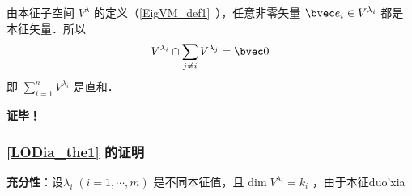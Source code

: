 由本征子空间 $V^\lambda$ 的定义（\autoref{EigVM_def1}~），任意非零矢量 $\bvec e_i\in V^{\lambda _i}$ 都是本征矢量．所以
\begin{equation}
V^{\lambda_i}\cap\sum_{j\neq i}V^{\lambda_j}=\bvec 0
\end{equation}
即  $\sum\limits_{i=1}^nV^{\lambda_i}$ 是直和．

\textbf{证毕！}
\subsubsection{\autoref{LODia_the1} 的证明}
\textbf{充分性}：设$\lambda_i\;(i=1,\cdots, m)$ 是不同本征值，且 $\mathrm{dim}\; V^{\lambda_i}=k_i$ ，由于本征duo'xia